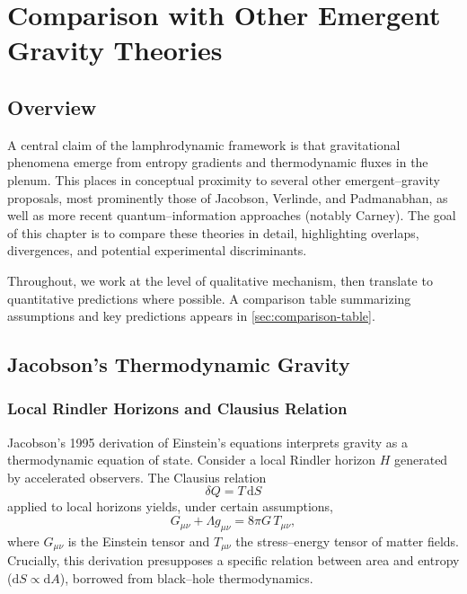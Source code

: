 
\chapter{Comparison with Other Emergent Gravity Theories}
\label{chap:comparison-emergent}

\section{Overview}

A central claim of the lamphrodynamic framework is that gravitational
phenomena emerge from entropy gradients and thermodynamic fluxes in the
plenum. This places \rsvpabbr{} in conceptual proximity to several other
emergent--gravity proposals, most prominently those of Jacobson,
Verlinde, and Padmanabhan, as well as more recent quantum--information
approaches (notably Carney). The goal of this chapter is to compare these
theories in detail, highlighting overlaps, divergences, and potential
experimental discriminants.

Throughout, we work at the level of qualitative mechanism, then translate
to quantitative predictions where possible. A comparison table summarizing
assumptions and key predictions appears in \cref{sec:comparison-table}.

\section{Jacobson's Thermodynamic Gravity}
\label{sec:jacobson}

\subsection{Local Rindler Horizons and Clausius Relation}

Jacobson's 1995 derivation of Einstein's equations interprets gravity as a
thermodynamic equation of state. Consider a local Rindler horizon $H$
generated by accelerated observers. The Clausius relation
\[
  \delta Q = T\,\mathrm{d}S
\]
applied to local horizons yields, under certain assumptions,
\[
  G_{\mu\nu} + \Lambda g_{\mu\nu} = 8\pi G\,T_{\mu\nu},
\]
where $G_{\mu\nu}$ is the Einstein tensor and $T_{\mu\nu}$ the stress--energy
tensor of matter fields. Crucially, this derivation presupposes a specific
relation between area and entropy ($\mathrm{d}S \propto \mathrm{d}A$), borrowed
from black--hole thermodynamics.

